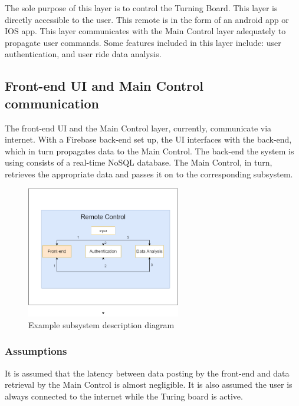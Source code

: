 The sole purpose of this layer is to control the Turning Board. This layer is directly accessible to the user. This remote is in the form of an android app or IOS app. This layer communicates with the Main Control layer adequately to propagate user commands. Some features included in this layer include: user authentication, and user ride data analysis.


\subsection{Front-end UI and Main Control communication }
The front-end UI and the Main Control layer, currently, communicate via internet. With a Firebase back-end set up, the UI interfaces with the back-end, which in turn propagates data to the Main Control. The back-end the system is using consists of a real-time NoSQL database. The Main Control, in turn, retrieves the appropriate data and passes it on to the corresponding subsystem.


\begin{figure}[h!]
	\centering
 	\includegraphics[width=0.60\textwidth]{ADS Latex/images/UIJetsonCom.png}
 \caption{Example subsystem description diagram}
\end{figure}

\subsubsection{Assumptions}
It is assumed that the latency between data posting by the front-end and data retrieval by the Main Control is almost negligible. It is also assumed the user is always connected to the internet while the Turing board is active.


